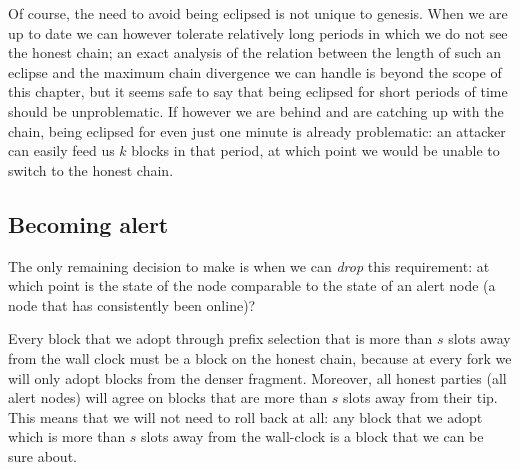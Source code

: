 Of course, the need to avoid being eclipsed is not unique to genesis. When we
are up to date we can however tolerate relatively long periods in which we do
not see the honest chain; an exact analysis of the relation between the length
of such an eclipse and the maximum chain divergence we can handle is beyond the
scope of this chapter, but it seems safe to say that being eclipsed for short
periods of time should be unproblematic. If however we are behind and are
catching up with the chain, being eclipsed for even just one minute is already
problematic: an attacker can easily feed us $k$ blocks in that period, at which
point we would be unable to switch to the honest chain.

\subsection{Becoming alert}
\label{genesis:becoming-alert}

The only remaining decision to make is when we can \emph{drop} this requirement:
at which point is the state of the node comparable to the state of an alert node
(a node that has consistently been online)?

Every block that we adopt through prefix selection that is more than $s$ slots
away from the wall clock must be a block on the honest chain, because at every
fork we will only adopt blocks from the denser fragment. Moreover, all honest
parties (all alert nodes) will agree on blocks that are more than $s$ slots away
from their tip. This means that we will not need to roll back at all: any block
that we adopt which is more than $s$ slots away from the wall-clock is a block
that we can be sure about.

\pagebreak

